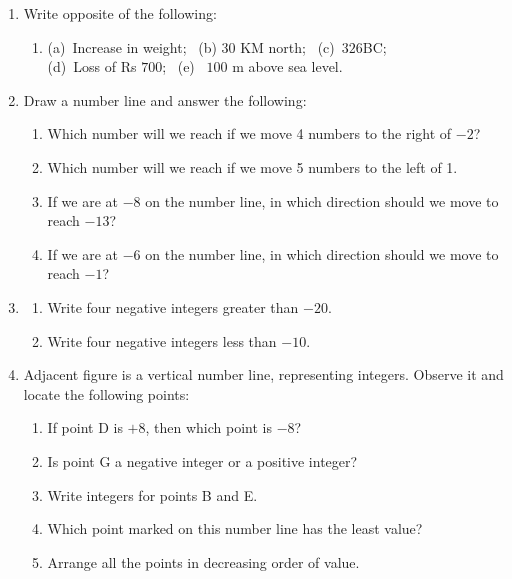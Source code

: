 \documentclass[a4paper,leqno,12pt]{amsart}
\begin{document}
\begin{enumerate}
\item Write opposite of the following:
\begin{enumerate}
\item[] (a)\  Increase in weight; \ (b) $30$ KM north; \ (c)\ $326$BC;\\
(d)\ Loss of Rs $700$; \ (e) \ $100$ m above sea level.
\end{enumerate}

\item Draw a number line and answer the following:
\begin{enumerate}
\item Which number will we reach if we move 4 numbers to the right of $-2$?
\item Which number will we reach if we move 5 numbers to the left of 1.
\item If we are at $-8$ on the number line, in which direction should we move to
reach $-13$?
\item If we are at $-6$ on the number line, in which direction should we move to
reach $-1$?
\end{enumerate}

\item
\begin{enumerate}
\item Write four negative integers greater than $-20$.
\item Write four negative integers less than $-10$.
\end{enumerate}
\item Adjacent figure is a vertical number line, representing integers. Observe
it and locate the following points:
\begin{enumerate}
\item If point D is $+8$, then which point is $-8$?
\item Is point G a negative integer or a positive integer?
\item Write integers for points B and E.
\item Which point marked on this number line has the least value?
\item Arrange all the points in decreasing order of value.
\end{enumerate}


\end{enumerate}
\end{document}
